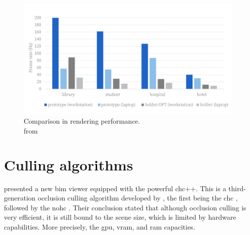 \begin{figure}[H]
    \centering
    \includegraphics[width=\textwidth]{figures/pdf/JohanssonPerformances.pdf}
    \caption[Performance viewers]{Comparison in rendering performance.\\ from \cite{Johansson2015}}
    \label{fig:performanceJohansson}
\end{figure}

\section{Culling algorithms}\label{sec:historyCulling}
\cite{Johansson2015} presented a new \ac{bim} viewer equipped with the powerful \ac{chc}++. This is a third-generation occlusion culling algorithm developed by \cite{Mattausch2008}, the first being the \ac{chc} \parencite{Bittner2004}, followed by the \ac{nohc} \parencite{Michael2006}. Their conclusion stated that although occlusion culling is very efficient, it is still bound to the scene size, which is limited by hardware capabilities. More precisely, the \ac{gpu}, \ac{vram}, and \ac{ram} capacities.